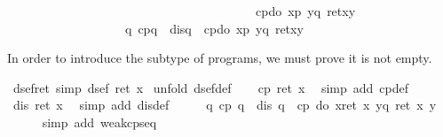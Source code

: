\begin{isabellebody}
\ \ \ \ \ \ \ \ \ \ \ \ \ \ \ \ \ \ \ \ \ \ \ \ \ \ \ \ \ \ \ \ \ \ \ \ \ \ \ \ cp{\isacharparenleft}do\ {\isacharbraceleft}x{\isasymleftarrow}p{\isacharsemicolon}\ y{\isasymleftarrow}q{}{\isacharsemicolon}\ ret{\isacharparenleft}x{\isacharcomma}y{\isacharparenright}{\isacharbraceright}{\isacharparenright}{\isasymrbrakk}\ {\isasymLongrightarrow}\isanewline
\ \ \ \ \ \ \ \ \ \ \ \ \ \ \ \ \ \ \ {\isacharparenleft}{\isasymforall}q{\isachardot}\ cp{\isacharparenleft}q{\isacharparenright}\ {\isasymand}\ dis{\isacharparenleft}q{\isacharparenright}\ {\isasymlongrightarrow}\ cp{\isacharparenleft}do\ {\isacharbraceleft}x{\isasymleftarrow}p{\isacharsemicolon}\ y{\isasymleftarrow}q{\isacharsemicolon}\ ret{\isacharparenleft}x{\isacharcomma}y{\isacharparenright}{\isacharbraceright}{\isacharparenright}{\isacharparenright}{\isachardoublequote}\isamarkupfalse%
%
\begin{isamarkuptext}%
In order to introduce the subtype of  programs, we
  must prove it is not empty.%
\end{isamarkuptext}%
\isamarkuptrue%
\ dsef{\isacharunderscore}ret\ {\isacharbrackleft}simp{\isacharbrackright}{\isacharcolon}\ {\isachardoublequote}dsef\ {\isacharparenleft}ret\ x{\isacharparenright}{\isachardoublequote}\isanewline
\isamarkupfalse%
\ {\isacharparenleft}unfold\ dsef{\isacharunderscore}def{\isacharparenright}\isanewline
\ \ \isamarkupfalse%
\ {\isachardoublequote}cp\ {\isacharparenleft}ret\ x{\isacharparenright}{\isachardoublequote}\ \isamarkupfalse%
\ {\isacharparenleft}simp\ add{\isacharcolon}\ cp{\isacharunderscore}def{\isacharparenright}\isanewline
\ \ \isamarkupfalse%
\ \isamarkupfalse%
\ {\isachardoublequote}dis\ {\isacharparenleft}ret\ x{\isacharparenright}{\isachardoublequote}\ \isamarkupfalse%
\ {\isacharparenleft}simp\ add{\isacharcolon}\ dis{\isacharunderscore}def{\isacharparenright}\isanewline
\ \ \isamarkupfalse%
\ \isamarkupfalse%
\ {\isachardoublequote}{\isacharparenleft}{\isasymforall}q{\isachardot}\ cp\ q\ {\isasymand}\ dis\ q\ {\isasymlongrightarrow}\ cp\ {\isacharparenleft}do\ {\isacharbraceleft}x{\isasymleftarrow}ret\ x{\isacharsemicolon}\ y{\isasymleftarrow}q{\isacharsemicolon}\ ret\ {\isacharparenleft}x{\isacharcomma}\ y{\isacharparenright}{\isacharbraceright}{\isacharparenright}{\isacharparenright}{\isachardoublequote}\isanewline
\ \ \ \ \isamarkupfalse%
\ {\isacharparenleft}simp\ add{\isacharcolon}\ weak{\isacharunderscore}cp{\isacharunderscore}seq{\isacharparenright}\isanewline

\end{isabellebody}
